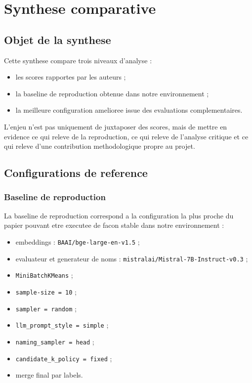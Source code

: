 \chapter{Synthese comparative}

\section{Objet de la synthese}

Cette synthese compare trois niveaux d'analyse :
\begin{itemize}[leftmargin=*]
  \item les scores rapportes par les auteurs ;
  \item la baseline de reproduction obtenue dans notre environnement ;
  \item la meilleure configuration amelioree issue des evaluations
  complementaires.
\end{itemize}

L'enjeu n'est pas uniquement de juxtaposer des scores, mais de mettre en
evidence ce qui releve de la reproduction, ce qui releve de l'analyse critique
et ce qui releve d'une contribution methodologique propre au projet.

\section{Configurations de reference}

\subsection{Baseline de reproduction}

La baseline de reproduction correspond a la configuration la plus proche du
papier pouvant etre executee de facon stable dans notre environnement :
\begin{itemize}[leftmargin=*]
  \item embeddings : \texttt{BAAI/bge-large-en-v1.5} ;
  \item evaluateur et generateur de noms :
  \texttt{mistralai/Mistral-7B-Instruct-v0.3} ;
  \item \texttt{MiniBatchKMeans} ;
  \item \texttt{sample-size = 10} ;
  \item \texttt{sampler = random} ;
  \item \texttt{llm\_prompt\_style = simple} ;
  \item \texttt{naming\_sampler = head} ;
  \item \texttt{candidate\_k\_policy = fixed} ;
  \item merge final par labels.
\end{itemize}

